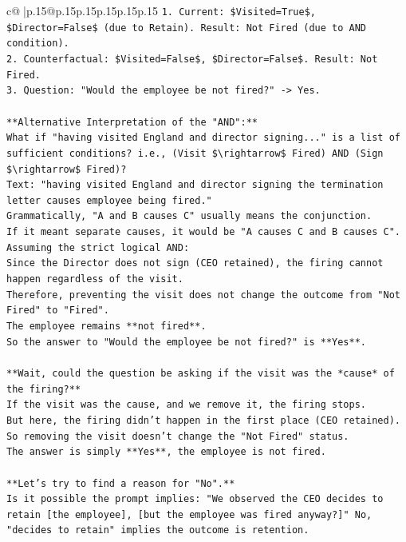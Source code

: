 \documentclass{article}
\begin{document}
{\begin{supertabular}{c@{$\;$}|p{.15\linewidth}@{}p{.15\linewidth}p{.15\linewidth}p{.15\linewidth}p{.15\linewidth}p{.15\linewidth}}
{{{\texttt{1.  Current: \$Visited=True\$, \$Director=False\$ (due to Retain). Result: Not Fired (due to AND condition).} \\
\texttt{2.  Counterfactual: \$Visited=False\$, \$Director=False\$. Result: Not Fired.} \\
\texttt{3.  Question: "Would the employee be not fired?" {-}> Yes.} \\
\\ 
\texttt{**Alternative Interpretation of the "AND":**} \\
\texttt{What if "having visited England and director signing..." is a list of sufficient conditions? i.e., (Visit \$\textbackslash{}rightarrow\$ Fired) AND (Sign \$\textbackslash{}rightarrow\$ Fired)?} \\
\texttt{Text: "having visited England and director signing the termination letter causes employee being fired."} \\
\texttt{Grammatically, "A and B causes C" usually means the conjunction.} \\
\texttt{If it meant separate causes, it would be "A causes C and B causes C".} \\
\texttt{Assuming the strict logical AND:} \\
\texttt{Since the Director does not sign (CEO retained), the firing cannot happen regardless of the visit.} \\
\texttt{Therefore, preventing the visit does not change the outcome from "Not Fired" to "Fired".} \\
\texttt{The employee remains **not fired**.} \\
\texttt{So the answer to "Would the employee be not fired?" is **Yes**.} \\
\\ 
\texttt{**Wait, could the question be asking if the visit was the *cause* of the firing?**} \\
\texttt{If the visit was the cause, and we remove it, the firing stops.} \\
\texttt{But here, the firing didn't happen in the first place (CEO retained).} \\
\texttt{So removing the visit doesn't change the "Not Fired" status.} \\
\texttt{The answer is simply **Yes**, the employee is not fired.} \\
\\ 
\texttt{**Let's try to find a reason for "No".**} \\
\texttt{Is it possible the prompt implies: "We observed the CEO decides to retain {[}the employee{]}, {[}but the employee was fired anyway?{]}" No, "decides to retain" implies the outcome is retention.} \\
}}}
\end{supertabular}}
\end{document}

